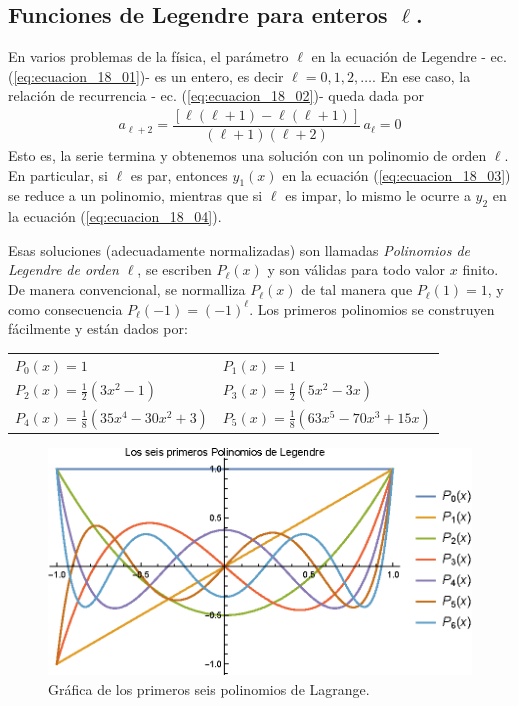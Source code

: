 \subsection{Funciones de Legendre para enteros $\ell$.}
En varios problemas de la física, el parámetro $\ell$ en la ecuación de Legendre - ec. (\ref{eq:ecuacion_18_01})- es un entero, es decir $\ell = 0,1,2,\ldots$. En ese caso, la relación de recurrencia - ec. (\ref{eq:ecuacion_18_02})- queda dada por
\begin{align*}
a_{\ell + 2} = \dfrac{[ \ell (\ell + 1) - \ell (\ell + 1) ]}{(\ell + 1)(\ell + 2)} \, a_{\ell} = 0
\end{align*}
Esto es, la serie termina y obtenemos una solución con un polinomio de orden $\ell$. En particular, si $\ell$ es par, entonces $y_{1}(x)$ en la ecuación (\ref{eq:ecuacion_18_03}) se reduce a un polinomio, mientras que si $\ell$ es impar, lo mismo le ocurre a $y_{2}$ en la ecuación (\ref{eq:ecuacion_18_04}).
\par
Esas soluciones (adecuadamente normalizadas) son llamadas \emph{Polinomios de Legendre de orden $\ell$}, se escriben $P_{\ell}(x)$ y son válidas para todo valor $x$ finito. De manera convencional, se normalliza $P_{\ell}(x)$ de tal manera que $P_{\ell}(1) =  1$, y como consecuencia $P_{\ell}(-1) = (-1)^{\ell}$. Los primeros polinomios se construyen fácilmente y están dados por:
\begin{center}
\begin{tabular}{l l}
$P_{0}(x) = 1 $ & $P_{1}(x) = 1 $ \\[0.5em]
$P_{2}(x) = \frac{1}{2} (3 x^{2} - 1)$ & $P_{3}(x) = \frac{1}{2} (5 x^{2} - 3 x)$ \\[0.5em] 
$P_{4}(x) = \frac{1}{8} (35 x^{4} - 30 x^{2} + 3)$ & $P_{5}(x) = \frac{1}{8} (63 x^{5} - 70 x^{3} + 15 x)$
\end{tabular}
\end{center}
\begin{figure}[H]
    \centering
    \includegraphics[scale=1]{Imagenes/Plot_Lagrange_0-6.eps}
    \caption{Gráfica de los primeros seis polinomios de Lagrange.}
    \label{fig:polinomios_Lagrange_01}
\end{figure}
